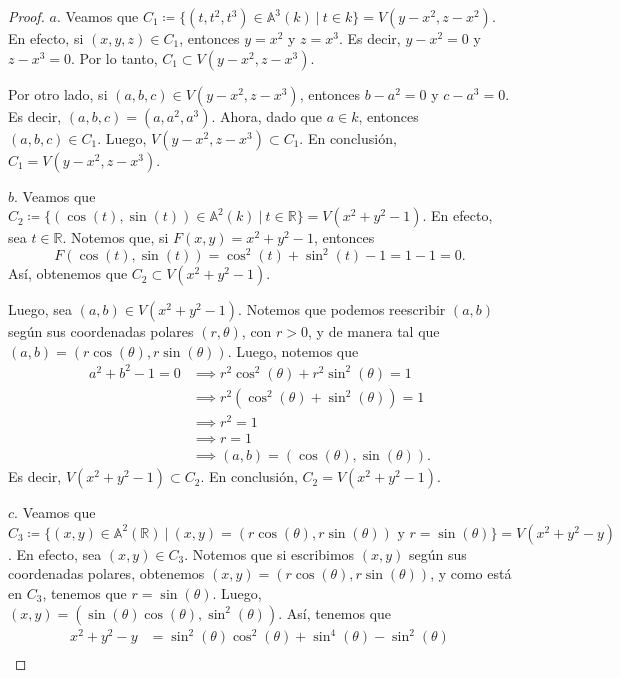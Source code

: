 \documentclass{amsart}
\theoremstyle{plain}
\newcommand{\R}{\mathbb{R}}
\begin{document}
	\begin{proof}
		$\boxed{a.}$ Veamos que $C_{1} \coloneq \{(t,t^{2},t^{3}) \in \mathbb{A}^{3}(k) \ | \ t \in k\} = V(y - x^{2}, z - x^{2})$. En efecto, si $(x,y,z) \in C_{1}$, entonces $y = x^{2}$ y $z = x^{3}$. Es decir, $y - x^{2} = 0$ y $z - x^{3} = 0$. Por lo tanto, $C_{1} \subset V(y - x^{2}, z - x^{3})$. \par
		Por otro lado, si $(a,b,c) \in V(y - x^{2}, z - x^{3})$, entonces $b - a^{2} = 0$ y $c - a^{3} = 0$. Es decir, $(a,b,c) = (a, a^{2}, a^{3})$. Ahora, dado que $a \in k$, entonces $(a,b,c) \in C_{1}$. Luego, $V(y - x^{2}, z - x^{3}) \subset C_{1}$. En conclusión, $C_{1} = V(y - x^{2}, z - x^{3})$. \par
		$\boxed{b.}$ Veamos que $C_{2} \coloneq \{(\cos(t), \sin(t)) \in \mathbb{A}^{2}(k) \ | \ t \in \R\} = V(x^{2} + y^{2} - 1)$. En efecto, sea $t \in \R$. Notemos que, si $F(x,y) = x^{2} + y^{2} - 1$, entonces
		\[ F(\cos(t), \sin(t)) = \cos^{2}(t) + \sin^{2}(t) - 1 = 1 - 1 = 0. \]
		Así, obtenemos que $C_{2} \subset V(x^{2} + y^{2} - 1)$. \par
		Luego, sea $(a,b) \in V(x^{2} + y^{2} - 1)$. Notemos que podemos reescribir $(a,b)$ según sus coordenadas polares $(r, \theta)$, con $r > 0$, y de manera tal que $(a,b) = (r \cos(\theta), r \sin(\theta))$. Luego, notemos que
		\begin{align*}
			a^{2} + b^{2} - 1 = 0 &\implies r^{2} \cos^{2}(\theta) + r^{2} \sin^{2}(\theta) = 1 \\
			&\implies r^{2}(\cos^{2}(\theta) + \sin^{2}(\theta)) = 1 \\
			&\implies r^{2} = 1 \\
			&\implies r = 1 \\
			&\implies (a,b) = (\cos(\theta), \sin(\theta))
		.\end{align*}
		Es decir, $V(x^{2} + y^{2} - 1) \subset C_{2}$. En conclusión, $C_{2} = V(x^{2} + y^{2} - 1)$. \par
		$\boxed{c.}$ Veamos que $C_{3} \coloneq \{(x,y) \in \mathbb{A}^{2}(\R) \ | \ (x,y) = (r\cos(\theta),r\sin(\theta)) \text{ y } r = \sin(\theta)\} = V(x^{2} + y^{2} - y)$. En efecto, sea $(x,y) \in C_{3}$. Notemos que si escribimos $(x,y)$ según sus coordenadas polares, obtenemos $(x,y) = (r\cos(\theta), r\sin(\theta))$, y como está en $C_{3}$, tenemos que $r = \sin(\theta)$. Luego, $(x,y) = (\sin(\theta) \cos(\theta), \sin^{2}(\theta))$. Así, tenemos que
		\begin{align*}
			x^{2} + y^{2} - y &= \sin^{2}(\theta) \cos^{2}(\theta) + \sin^{4}(\theta) - \sin^{2}(\theta) \\

\end{align*}
\end{proof}
\end{document}
